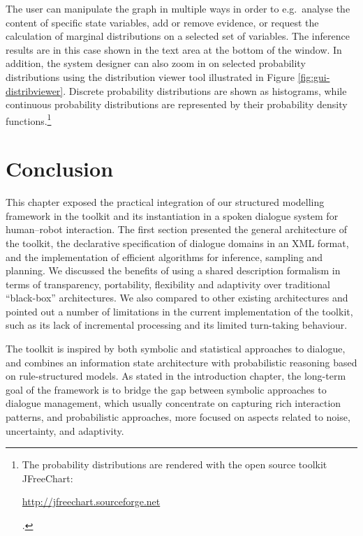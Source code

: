 The user can manipulate the graph in multiple ways in order to e.g.\ analyse the content of specific state variables, add or remove evidence, or request the calculation of marginal distributions on a selected set of variables.  The inference results are in this case shown in the text area at the bottom of the window.  In addition, the system designer can also zoom in on selected probability distributions using the distribution viewer tool illustrated in Figure \ref{fig:gui-distribviewer}. Discrete probability distributions are shown as histograms, while continuous probability distributions are represented by their probability density functions.\footnote{The probability distributions are rendered with the open source toolkit JFreeChart: \begin{scriptsize}\url{http://jfreechart.sourceforge.net}\end{scriptsize}.} 


\section{Conclusion}

This chapter exposed the practical integration of our structured modelling framework in the \opendial{} toolkit and its instantiation in a spoken dialogue system for human--robot interaction. The first section presented the general architecture of the toolkit, the declarative specification of dialogue domains in an XML format, and the implementation of efficient algorithms for inference, sampling and planning. We discussed the benefits of using a shared description formalism in terms of transparency, portability, flexibility and adaptivity over traditional ``black-box'' architectures. We also compared \opendial{} to other existing architectures and pointed out a number of limitations in the current implementation of the toolkit, such as its lack of incremental processing and its limited turn-taking behaviour. 

The \opendial{} toolkit is inspired by both symbolic and statistical approaches to dialogue, and combines an information state architecture with probabilistic reasoning based on rule-structured models.  As stated in the introduction chapter, the long-term goal of the \opendial{} framework is to bridge the gap between symbolic approaches to dialogue management, which usually concentrate on capturing rich interaction patterns, and probabilistic approaches, more focused on aspects related to noise, uncertainty, and adaptivity. 


